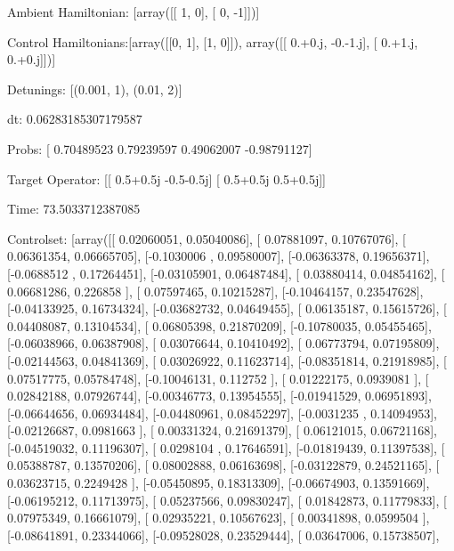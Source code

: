\documentclass{article}
\begin{document}
    

\newpage

Ambient Hamiltonian: [array([[ 1,  0],
       [ 0, -1]])]

Control Hamiltonians:[array([[0, 1],
       [1, 0]]), array([[ 0.+0.j, -0.-1.j],
       [ 0.+1.j,  0.+0.j]])]

Detunings: [(0.001, 1), (0.01, 2)]

 dt: 0.06283185307179587

Probs: [ 0.70489523  0.79239597  0.49062007 -0.98791127]

Target Operator: [[ 0.5+0.5j -0.5-0.5j]
 [ 0.5+0.5j  0.5+0.5j]]

Time: 73.5033712387085

Controlset: [array([[ 0.02060051,  0.05040086],
       [ 0.07881097,  0.10767076],
       [ 0.06361354,  0.06665705],
       [-0.1030006 ,  0.09580007],
       [-0.06363378,  0.19656371],
       [-0.0688512 ,  0.17264451],
       [-0.03105901,  0.06487484],
       [ 0.03880414,  0.04854162],
       [ 0.06681286,  0.226858  ],
       [ 0.07597465,  0.10215287],
       [-0.10464157,  0.23547628],
       [-0.04133925,  0.16734324],
       [-0.03682732,  0.04649455],
       [ 0.06135187,  0.15615726],
       [ 0.04408087,  0.13104534],
       [ 0.06805398,  0.21870209],
       [-0.10780035,  0.05455465],
       [-0.06038966,  0.06387908],
       [ 0.03076644,  0.10410492],
       [ 0.06773794,  0.07195809],
       [-0.02144563,  0.04841369],
       [ 0.03026922,  0.11623714],
       [-0.08351814,  0.21918985],
       [ 0.07517775,  0.05784748],
       [-0.10046131,  0.112752  ],
       [ 0.01222175,  0.0939081 ],
       [ 0.02842188,  0.07926744],
       [-0.00346773,  0.13954555],
       [-0.01941529,  0.06951893],
       [-0.06644656,  0.06934484],
       [-0.04480961,  0.08452297],
       [-0.0031235 ,  0.14094953],
       [-0.02126687,  0.0981663 ],
       [ 0.00331324,  0.21691379],
       [ 0.06121015,  0.06721168],
       [-0.04519032,  0.11196307],
       [ 0.0298104 ,  0.17646591],
       [-0.01819439,  0.11397538],
       [ 0.05388787,  0.13570206],
       [ 0.08002888,  0.06163698],
       [-0.03122879,  0.24521165],
       [ 0.03623715,  0.2249428 ],
       [-0.05450895,  0.18313309],
       [-0.06674903,  0.13591669],
       [-0.06195212,  0.11713975],
       [ 0.05237566,  0.09830247],
       [ 0.01842873,  0.11779833],
       [ 0.07975349,  0.16661079],
       [ 0.02935221,  0.10567623],
       [ 0.00341898,  0.0599504 ],
       [-0.08641891,  0.23344066],
       [-0.09528028,  0.23529444],
       [ 0.03647006,  0.15738507],
\end{document}
